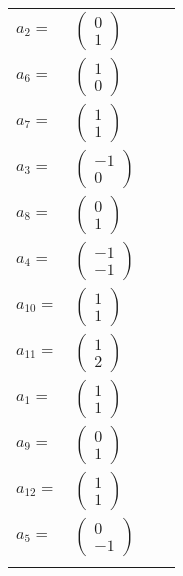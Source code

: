 \documentclass[1p]{elsarticle_modified}
\theoremstyle{definition}
\begin{document}
\begin{tabular}{m{7pt} m{180pt} m{7pt} m{180pt} }
\flushright $a_{2}=$&$\begin{pmatrix}0\\1\end{pmatrix}$ \\
\flushright $a_{6}=$&$\begin{pmatrix}1\\0\end{pmatrix}$ \\
\flushright $a_{7}=$&$\begin{pmatrix}1\\1\end{pmatrix}$ \\
\flushright $a_{3}=$&$\begin{pmatrix}-1\\0\end{pmatrix}$ \\
\flushright $a_{8}=$&$\begin{pmatrix}0\\1\end{pmatrix}$ \\
\flushright $a_{4}=$&$\begin{pmatrix}-1\\-1\end{pmatrix}$ \\
\flushright $a_{10}=$&$\begin{pmatrix}1\\1\end{pmatrix}$ \\
\flushright $a_{11}=$&$\begin{pmatrix}1\\2\end{pmatrix}$ \\
\flushright $a_{1}=$&$\begin{pmatrix}1\\1\end{pmatrix}$ \\
\flushright $a_{9}=$&$\begin{pmatrix}0\\1\end{pmatrix}$ \\
\flushright $a_{12}=$&$\begin{pmatrix}1\\1\end{pmatrix}$ \\
\flushright $a_{5}=$&$\begin{pmatrix}0\\-1\end{pmatrix}$\\&\end{tabular}
\end{document}
